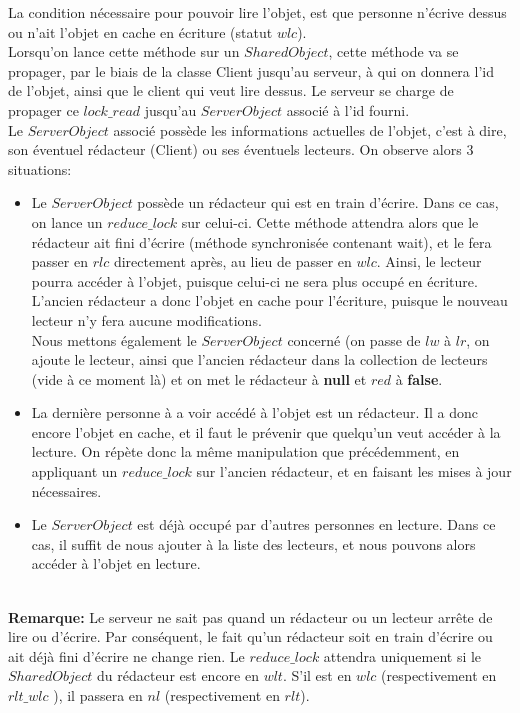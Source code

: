 \documentclass[11pt,a4paper]{report}
\begin{document}
La condition nécessaire pour pouvoir lire l'objet, est que personne n'écrive dessus ou n'ait l'objet en cache en écriture (statut $wlc$). \\
Lorsqu'on lance cette méthode sur un $SharedObject$, cette méthode va se propager, par le biais de la classe Client jusqu'au serveur, à qui on donnera l'id de l'objet, ainsi que le client qui veut lire dessus. Le serveur se charge de propager ce $lock\_read$ jusqu'au $ServerObject$ associé à l'id fourni. \\
Le $ServerObject$ associé possède les informations actuelles de l'objet, c'est à dire, son éventuel rédacteur (Client) ou ses éventuels lecteurs. On observe alors 3 situations: 
\begin{itemize}
\item Le $ServerObject$ possède un rédacteur qui est en train d'écrire. Dans ce cas, on lance un $reduce\_lock$ sur celui-ci. Cette méthode attendra alors que le rédacteur ait fini d'écrire (méthode synchronisée contenant wait), et le fera passer en $rlc$ directement après, au lieu de passer en $wlc$. Ainsi, le lecteur pourra accéder à l'objet, puisque celui-ci ne sera plus occupé en écriture. L'ancien rédacteur a donc l'objet en cache pour l'écriture, puisque le nouveau lecteur n'y fera aucune modifications. \\
Nous mettons également le $ServerObject$ concerné (on passe de $lw$ à $lr$, on ajoute le lecteur, ainsi que l'ancien rédacteur dans la collection de lecteurs (vide à ce moment là) et on met le rédacteur à {\bf null} et $red$ à \textbf{false}.
\item La dernière personne à a voir accédé à l'objet est un rédacteur. Il a donc encore l'objet en cache, et il faut le prévenir que quelqu'un veut accéder à la lecture. On répète donc la même manipulation que précédemment, en appliquant un $reduce\_lock$ sur l'ancien rédacteur, et en faisant les mises à jour nécessaires. 
\item Le $ServerObject$ est déjà occupé par d'autres personnes en lecture. Dans ce cas, il suffit de nous ajouter à la liste des lecteurs, et nous pouvons alors accéder à l'objet en lecture.\\\\
\end{itemize}

\textbf{Remarque:} Le serveur ne sait pas quand un rédacteur ou un lecteur arrête de lire ou d'écrire. Par conséquent, le fait qu'un rédacteur soit en train d'écrire ou ait déjà fini d'écrire ne change rien. Le $reduce\_lock$ attendra uniquement si le $SharedObject$ du rédacteur est encore en $wlt$. S'il est en $wlc$ (respectivement en $rlt\_wlc$ ), il passera en $nl$ (respectivement en $rlt$).\\\\
\end{document}
